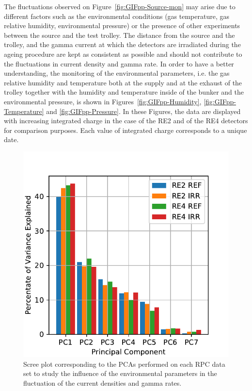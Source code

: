 	The fluctuations observed on Figure~\ref{fig:GIFpp-Source-mon} may arise due to different factors such as the environmental conditions (gas temperature, gas relative humidity, environmental pressure) or the presence of other experiments between the source and the test trolley. The distance from the source and the trolley, and the gamma current at which the detectors are irradiated during the ageing procedure are kept as consistent as possible and should not contribute to the fluctuations in current density and gamma rate. In order to have a better understanding, the monitoring of the environmental parameters, i.e. the gas relative humidity and temperature both at the supply and at the exhaust of the trolley together with the humidity and temperature inside of the bunker and the environmental pressure, is shown in Figures~\ref{fig:GIFpp-Humidity}, \ref{fig:GIFpp-Temperature} and \ref{fig:GIFpp-Pressure}. In these Figures, the data are displayed with increasing integrated charge in the case of the RE2 and of the RE4 detectors for comparison purposes. Each value of integrated charge corresponds to a unique date.
	
\begingroup\setlength{\intextsep}{0pt}\setlength{\columnsep}{15pt}

	\begin{figure}
    	\centering
		\includegraphics[width = \linewidth]{fig/chapt5/Scree_plot_Full-Data.pdf}
        \caption{\label{fig:GIFpp-Scree_FullData} Scree plot corresponding to the PCAs performed on each RPC data set to study the influence of the environmental parameters in the fluctuation of the current densities and gamma rates.}
	\end{figure}
	

